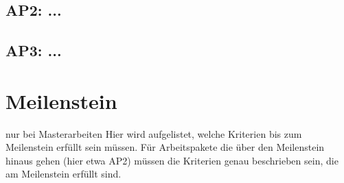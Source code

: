 \documentclass[german=true,thesistype=bachelor,proposal]{tubsthesis}
\begin{document}
\begin{thesis}
\subsection{AP2: ...} %
\lipsum[2]

\subsection{AP3: ...} %
\lipsum[3]

\section{Meilenstein} %
nur bei Masterarbeiten
Hier wird aufgelistet, welche Kriterien bis zum Meilenstein erfüllt sein müssen.
Für Arbeitspakete die über den Meilenstein hinaus gehen (hier etwa AP2) müssen die Kriterien
genau beschrieben sein, die am Meilenstein erfüllt sind.


\lipsum[5]

\end{thesis}
\end{document}
